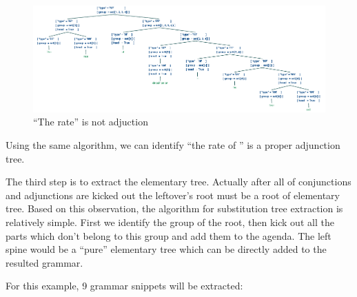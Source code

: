 \documentclass[a4paper]{article}
\begin{document}
\begin{figure}[h]
    \begin{center}
        \includegraphics[scale=0.4]{noadj.png}
    \end{center}
    \caption{``The rate'' is not adjuction}
    \label{fig:no-adjunct}
\end{figure}

Using the same algorithm, we can identify ``the rate of '' is a proper adjunction tree.

The third step is to extract the elementary tree. Actually after all of conjunctions and adjunctions are kicked out the leftover's root must be a root of elementary tree. Based on this observation, the algorithm for substitution tree extraction is relatively simple. First we identify the group of the root, then kick out all the parts which don't belong to this group and add them to the agenda. The left spine would be a ``pure'' elementary tree which can be directly added to the resulted grammar.

For this example, 9 grammar snippets will be extracted:
\end{document}

